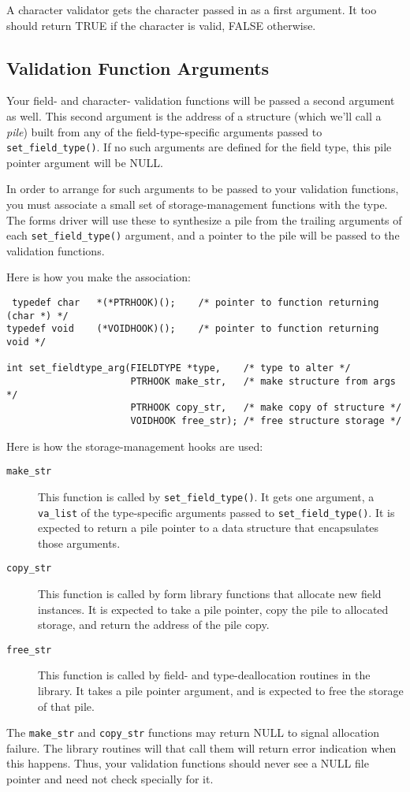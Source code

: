 A character validator gets the character passed in as a first argument.
It too should return TRUE if the character is valid, FALSE otherwise.

\subsection{Validation Function Arguments}

\label{f0:fcheckargs}Your field- and character- validation functions will be passed a
second argument as well.  This second argument is the address of a
structure (which we'll call a \emph{pile}) built from any of the
field-type-specific arguments passed to \texttt{set\_field\_type()}.  If
no such arguments are defined for the field type, this pile pointer
argument will be NULL. 

In order to arrange for such arguments to be passed to your validation
functions, you must associate a small set of storage-management functions
with the type.  The forms driver will use these to synthesize a pile
from the trailing arguments of each \texttt{set\_field\_type()} argument, and
a pointer to the pile will be passed to the validation functions. 

Here is how you make the association:
\begin{verbatim} typedef char	*(*PTRHOOK)();    /* pointer to function returning (char *) */
typedef void	(*VOIDHOOK)();    /* pointer to function returning void */

int set_fieldtype_arg(FIELDTYPE *type,    /* type to alter */
                      PTRHOOK make_str,   /* make structure from args */
                      PTRHOOK copy_str,   /* make copy of structure */
                      VOIDHOOK free_str); /* free structure storage */
\end{verbatim}
Here is how the storage-management hooks are used:
\begin{description}
\item[ \texttt{make\_str}]  This function is called by \texttt{set\_field\_type()}.  It gets one
argument, a \texttt{va\_list} of the type-specific arguments passed to
\texttt{set\_field\_type()}.  It is expected to return a pile pointer to a data
structure that encapsulates those arguments.
\item[ \texttt{copy\_str}]  This function is called by form library functions that allocate new
field instances.  It is expected to take a pile pointer, copy the pile
to allocated storage, and return the address of the pile copy.
\item[ \texttt{free\_str}]  This function is called by field- and type-deallocation routines in the
library.  It takes a pile pointer argument, and is expected to free the
storage of that pile.
\end{description}
The \texttt{make\_str} and \texttt{copy\_str} functions may return NULL to
signal allocation failure.  The library routines will that call them will
return error indication when this happens.  Thus, your validation functions
should never see a NULL file pointer and need not check specially for it.

